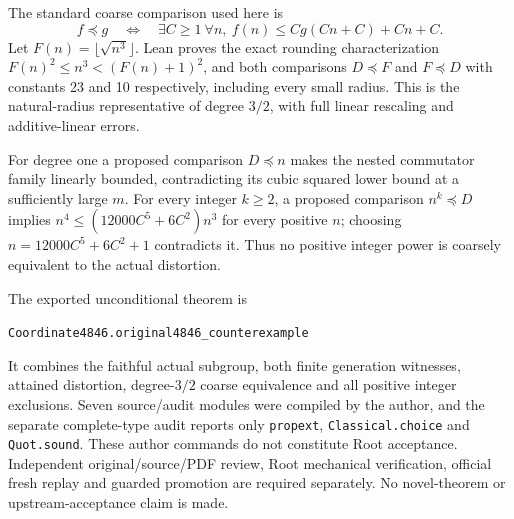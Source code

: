 \documentclass[11pt]{article}
\begin{document}
The standard coarse comparison used here is
\[
 f\preceq g\quad\Longleftrightarrow\quad
 \exists C\geq1\ \forall n,\ f(n)\leq Cg(Cn+C)+Cn+C.
\]
Let $F(n)=\lfloor\sqrt{n^3}\rfloor$. Lean proves the exact rounding
characterization $F(n)^2\leq n^3<(F(n)+1)^2$, and both comparisons
$D\preceq F$ and $F\preceq D$ with constants 23 and 10 respectively,
including every small radius. This is the natural-radius representative
of degree $3/2$, with full linear rescaling and additive-linear errors.

For degree one a proposed comparison $D\preceq n$ makes the nested
commutator family linearly bounded, contradicting its cubic squared lower
bound at a sufficiently large $m$. For every integer $k\geq2$, a proposed
comparison $n^k\preceq D$ implies
$n^4\leq(12000C^5+6C^2)n^3$ for every positive $n$; choosing
$n=12000C^5+6C^2+1$ contradicts it. Thus no positive integer power is
coarsely equivalent to the actual distortion.

The exported unconditional theorem is
\begin{center}\small\texttt{Coordinate4846.original4846\_counterexample}\end{center}
It combines the faithful actual subgroup, both finite generation witnesses,
attained distortion, degree-$3/2$ coarse equivalence and all positive integer
exclusions. Seven source/audit modules were compiled by the author, and
the separate complete-type audit reports only \texttt{propext},
\texttt{Classical.choice} and \texttt{Quot.sound}. These author commands
do not constitute Root acceptance. Independent original/source/PDF review,
Root mechanical verification, official fresh replay and guarded promotion
are required separately. No novel-theorem or upstream-acceptance claim is made.
\end{document}
